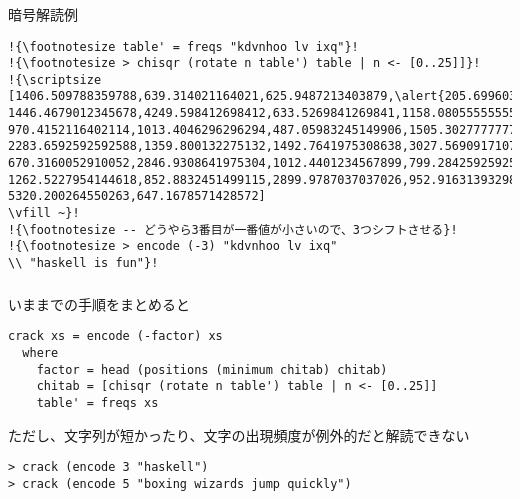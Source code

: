 \documentclass[dvipdfmx,cjk,xcolor=dvipsnames,envcountsect,notheorems,12pt]{beamer}
\theoremstyle{definition}
\begin{document}
\begin{frame}[fragile]
\frametitle{}
\begin{exampleblock}{暗号解読例}
\begin{lstlisting}[escapechar=!,frame=none]
!{\footnotesize table' = freqs "kdvnhoo lv ixq"}!
!{\footnotesize > chisqr (rotate n table') table | n <- [0..25]]}!
!{\scriptsize [1406.509788359788,639.314021164021,625.9487213403879,\alert{205.69960317460308},\\
1446.4679012345678,4249.598412698412,633.5269841269841,1158.0805555555555,\\
970.4152116402114,1013.4046296296294,487.05983245149906,1505.3027777777775,\\
2283.6592592592588,1359.800132275132,1492.7641975308638,3027.569091710757,\\
670.3160052910052,2846.9308641975304,1012.4401234567899,799.2842592592591,\\
1262.5227954144618,852.8832451499115,2899.9787037037026,952.9163139329804,\\
5320.200264550263,647.1678571428572]
\vfill ~}!
!{\footnotesize -- どうやら3番目が一番値が小さいので、3つシフトさせる}!
!{\footnotesize > encode (-3) "kdvnhoo lv ixq" 
\\ "haskell is fun"}!
\end{lstlisting}
\end{exampleblock}
\end{frame}

\begin{frame}[fragile]
\frametitle{}
いままでの手順をまとめると
\begin{lstlisting}[basicstyle={\ttfamily\scriptsize}]
crack xs = encode (-factor) xs
  where
    factor = head (positions (minimum chitab) chitab)
    chitab = [chisqr (rotate n table') table | n <- [0..25]]
    table' = freqs xs
\end{lstlisting}
ただし、文字列が短かったり、文字の出現頻度が例外的だと解読できない
\begin{lstlisting}[basicstyle={\ttfamily\scriptsize}]
> crack (encode 3 "haskell")
> crack (encode 5 "boxing wizards jump quickly")
\end{lstlisting}
\end{frame}


\end{document}
